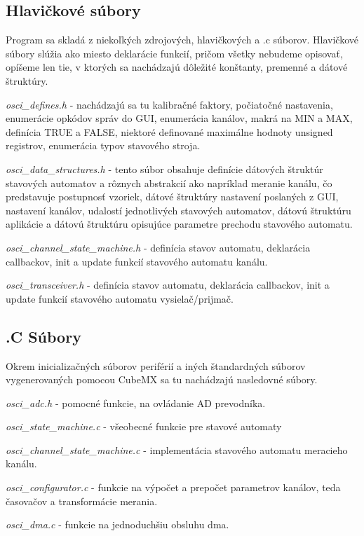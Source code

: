 \documentclass[main.tex]{subfiles}
\begin{document}
\begin{multicols*}{2}
			\subsection{Hlavičkové súbory}
			Program sa skladá z niekoľkých zdrojových, hlavičkových a  .c súborov. Hlavičkové súbory slúžia ako miesto deklarácie funkcií, pričom všetky nebudeme opisovať, opíšeme len tie, v ktorých sa nachádzajú dôležité konštanty, premenné a dátové štruktúry.
			
			\textit{osci\_defines.h } - nachádzajú sa tu kalibračné faktory, počiatočné nastavenia, enumerácie opkódov správ do GUI, enumerácia kanálov, makrá na MIN a MAX, definícia TRUE a FALSE, niektoré definované maximálne hodnoty unsigned registrov, enumerácia typov stavového stroja.
			
			\textit{osci\_data\_structures.h} - tento súbor obsahuje definície dátových štruktúr stavových automatov a rôznych abstrakcií ako napríklad meranie kanálu, čo predstavuje postupnosť vzoriek, dátové štruktúry nastavení poslaných z GUI, nastavení kanálov, udalostí jednotlivých stavových automatov, dátovú štruktúru aplikácie a dátovú štruktúru opisujúce parametre prechodu stavového automatu.
			
			\textit{osci\_channel\_state\_machine.h} - definícia stavov automatu, deklarácia callbackov, init a update funkcií stavového automatu kanálu.
			
			\textit{osci\_transceiver.h} - definícia stavov automatu, deklarácia callbackov, init a update funkcií stavového automatu vysielač/prijmač.
			
			\subsection{.C Súbory}
			Okrem inicializačných súborov periférií a iných štandardných súborov vygenerovaných pomocou CubeMX sa tu nachádzajú nasledovné súbory.
			
			\textit{ osci\_adc.h} - pomocné funkcie, na ovládanie AD prevodníka. 
			
			
			\textit{ osci\_state\_machine.c} - všeobecné funkcie pre stavové automaty
			
			\textit{ osci\_channel\_state\_machine.c} - implementácia stavového automatu meracieho kanálu. 
			
			\textit{ osci\_configurator.c} -  funkcie na výpočet a prepočet parametrov kanálov, teda časovačov a transformácie merania. 
			
			\textit{ osci\_dma.c} - funkcie na jednoduchšiu obsluhu dma. 
			

\end{multicols*}
\end{document}
